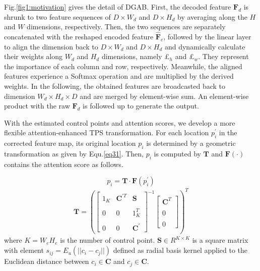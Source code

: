 \documentclass{article}
\begin{document}
Fig.\ref{fig1:motivation} gives the detail of DGAB. First, the decoded feature $\boldsymbol{F}_{d}$ is shrunk to two feature sequences of $D \times W_{d}$ and $D \times H_{d}$ by averaging along the $H$ and $W$ dimensions, respectively. Then, the two sequences are separately concatenated with the reshaped encoded feature $\boldsymbol{\hat{F}}_{e}$, followed by the linear layer to align the dimension back to $D \times W_{d}$ and $D \times H_{d}$ and dynamically calculate their weights along $W_{d}$ and $H_{d}$ dimensions, namely £$_{h}$ and £$_{w}$. They represent the importance of each column and row, respectively. Meanwhile, the aligned features experience a Softmax operation and are multiplied by the derived weights. In the following, the obtained features are broadcasted back to dimension $W_{d}\times H_{d}\times D$ and are merged by element-wise sum. An element-wise product with the raw $\boldsymbol{F}_{d}$ is followed up to generate the output. 

With the estimated control points and attention scores, we develop a more flexible attention-enhanced TPS transformation. For each location $p_{i}^{\prime}$ in the corrected feature map, its original location $p_{i}$ is determined by a geometric transformation as given by Equ.\ref{eq31}. Then, $p_{i}$ is computed by $\boldsymbol{T}$ and $\boldsymbol{F}(\cdot)$ contains the attention score as follows.

\begin{equation}
p_{i}=\boldsymbol{T} \cdot \boldsymbol{F}\left(p_{i}^{\prime}\right)
\label{eq31}
\end{equation}
\begin{gather}
\boldsymbol{T}=\left(\left[\begin{array}{lll}
1_{K} & \boldsymbol{C}^{\prime T} & \boldsymbol{S} \\ \\
0 & 0 & 1_{K}^{T} \\ \\
0 & 0 & \boldsymbol{C}^{\prime}
\end{array}\right]^{-1}\left[\begin{array}{l}
\boldsymbol{C}^{T} \\ \\
0 \\ \\
0
\end{array}\right]\right)^{T}
\label{eq4}
\end{gather}
\noindent where $K=W_{e}H_{e}$ is the number of control point. $\boldsymbol{S} \in R^{K\times K}$ is a square matrix with element $s_{ij} = E_{u}(||c_{i}-c_{j}||)$ defined as radial basis kernel applied to the Euclidean distance between $c_{i} \in \boldsymbol{C}$ and $c_{j} \in \boldsymbol{C}$.
\end{document}
